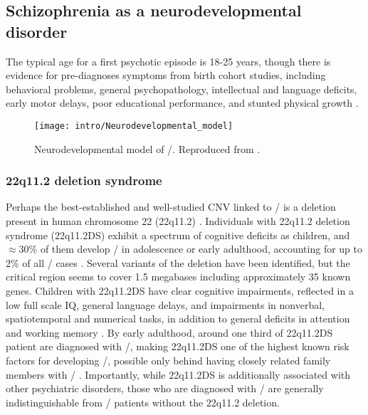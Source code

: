 \subsection{Schizophrenia as a neurodevelopmental disorder}
\label{sec:intro:scz:neurodevelopment}
The typical age for a first psychotic episode is 18-25 years, though there is 
evidence for pre-diagnoses symptoms from birth cohort studies, including behavioral problems, general psychopathology, intellectual and language deficits, early motor delays, poor educational performance, and stunted physical growth \citep{Welham2009}.
\citep{Lewis2002, Insel2010a}
\begin{figure}
	\centering
	\texttt{[image: intro/Neurodevelopmental\_model]}
	\caption[Neurodevelopmental model of \scz/]{Neurodevelopmental model of \scz/. Reproduced from \citet{Insel2010a}.}
	\label{fig:intro:scz:neurodevelopmental}
\end{figure}

\subsubsection{22q11.2 deletion syndrome}
\label{sec:intro:scz:22q11}
Perhaps the best-established and well-studied CNV linked to \scz/ is a deletion present in human chromosome 22 (22q11.2) \citep{Karayiorgou1995, Chow2006, Karayiorgou2010}.
Individuals with 22q11.2 deletion syndrome (22q11.2DS) exhibit a spectrum of cognitive deficits as children, and $\approx$30\% of them develop \scz/ in adolescence or early adulthood, accounting for up to 2\% of all \scz/ cases \citep{Stark2008}.
Several variants of the deletion have been identified, but the critical region seems to cover 1.5 megabases including approximately 35 known genes.
Children with 22q11.2DS have clear cognitive impairments, reflected in a low full scale IQ, general language delays, and impairments in nonverbal, spatiotemporal and numerical tasks, in addition to general deficits in attention and working memory \citep{Karayiorgou2010}.
By early adulthood, around one third of 22q11.2DS patient are diagnosed with \scz/, making 22q11.2DS one of the highest known risk factors for developing \scz/, possible only behind having closely related family members with \scz/ \citep{Murphy1999}.
Importantly, while 22q11.2DS is additionally associated with other psychiatric disorders, those who are diagnosed with \scz/ are generally indistinguishable from \scz/ patients without the 22q11.2 deletion.

